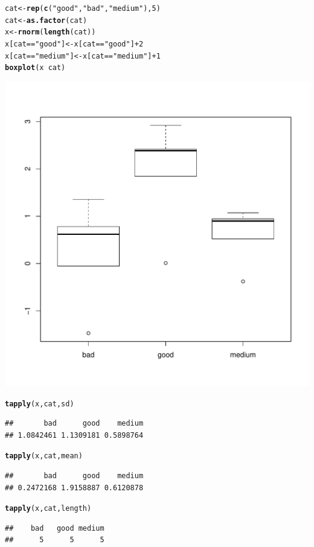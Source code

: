 \documentclass[10pt]{article}\usepackage[]{graphicx}\usepackage[]{color}
\makeatletter
\def\maxwidth{ %
  \ifdim\Gin@nat@width>\linewidth
    \linewidth
  \else
    \Gin@nat@width
  \fi
}
\newcommand{\hlnum}[1]{\textcolor[rgb]{0.686,0.059,0.569}{#1}}%
\newcommand{\hlstr}[1]{\textcolor[rgb]{0.192,0.494,0.8}{#1}}%
\newcommand{\hlopt}[1]{\textcolor[rgb]{0,0,0}{#1}}%
\newcommand{\hlstd}[1]{\textcolor[rgb]{0.345,0.345,0.345}{#1}}%
\newcommand{\hlkwb}[1]{\textcolor[rgb]{0.69,0.353,0.396}{#1}}%
\newcommand{\hlkwd}[1]{\textcolor[rgb]{0.737,0.353,0.396}{\textbf{#1}}}%
\newenvironment{kframe}{%
 \def\at@end@of@kframe{}%
 \ifinner\ifhmode%
  \def\at@end@of@kframe{\end{minipage}}%
  \begin{minipage}{\columnwidth}%
 \fi\fi%
 \def\FrameCommand##1{\hskip\@totalleftmargin \hskip-\fboxsep
 \colorbox{shadecolor}{##1}\hskip-\fboxsep
     \hskip-\linewidth \hskip-\@totalleftmargin \hskip\columnwidth}%
 \MakeFramed {\advance\hsize-\width
   \@totalleftmargin\z@ \linewidth\hsize
   \@setminipage}}%
 {\par\unskip\endMakeFramed%
 \at@end@of@kframe}
\newenvironment{knitrout}{}{} %
\makeatother
\begin{document}
\begin{knitrout}
\color{fgcolor}\begin{kframe}
\begin{alltt}
\hlstd{cat} \hlkwb{<-} \hlkwd{rep}\hlstd{(}\hlkwd{c}\hlstd{(}\hlstr{"good"}\hlstd{,} \hlstr{"bad"}\hlstd{,} \hlstr{"medium"}\hlstd{),}\hlnum{5}\hlstd{)}
\hlstd{cat} \hlkwb{<-} \hlkwd{as.factor}\hlstd{(cat)}
\hlstd{x} \hlkwb{<-} \hlkwd{rnorm}\hlstd{(}\hlkwd{length}\hlstd{(cat))}
\hlstd{x[cat} \hlopt{==} \hlstr{"good"}\hlstd{]} \hlkwb{<-} \hlstd{x[cat} \hlopt{==} \hlstr{"good"}\hlstd{]}\hlopt{+}\hlnum{2}
\hlstd{x[cat} \hlopt{==} \hlstr{"medium"}\hlstd{]} \hlkwb{<-} \hlstd{x[cat} \hlopt{==} \hlstr{"medium"}\hlstd{]}\hlopt{+}\hlnum{1}
\hlkwd{boxplot}\hlstd{(x}\hlopt{~}\hlstd{cat)}
\end{alltt}
\end{kframe}
\includegraphics[width=\maxwidth]{figure/unnamed-chunk-27-1} 
\begin{kframe}\begin{alltt}
\hlkwd{tapply}\hlstd{(x,cat,sd)}
\end{alltt}
\begin{verbatim}
##       bad      good    medium 
## 1.0842461 1.1309181 0.5898764
\end{verbatim}
\begin{alltt}
\hlkwd{tapply}\hlstd{(x,cat,mean)}
\end{alltt}
\begin{verbatim}
##       bad      good    medium 
## 0.2472168 1.9158887 0.6120878
\end{verbatim}
\begin{alltt}
\hlkwd{tapply}\hlstd{(x,cat,length)}
\end{alltt}
\begin{verbatim}
##    bad   good medium 
##      5      5      5
\end{verbatim}
\end{kframe}
\end{knitrout}
\end{document}
